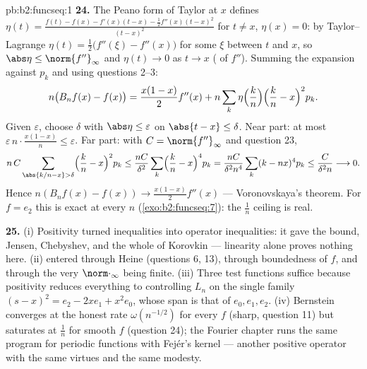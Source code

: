 \begin{solution}{pb:b2:funcseq:1}
\textbf{24.} The Peano form of Taylor at $x$ defines $\eta(t) =
\frac{f(t) - f(x) - f'(x)(t-x) - \frac12f''(x)(t-x)^2}
{(t-x)^2}$ for $t \neq x$, $\eta(x) = 0$: by Taylor--Lagrange
$\eta(t) = \frac12\bigl(f''(\xi) - f''(x)\bigr)$ for some $\xi$
between $t$ and $x$, so $\abs\eta \leq \norm{f''}_\infty$ and
$\eta(t) \to 0$ as $t \to x$ ( of $f''$). Summing
the expansion against $p_k$ and using questions 2--3:
\[
n\bigl(B_nf(x) - f(x)\bigr)
= \frac{x(1-x)}{2}f''(x)
+ n\sum_k\eta\Bigl(\frac kn\Bigr)\Bigl(\frac kn -
x\Bigr)^2p_k .
\]
Given $\varepsilon$, choose $\delta$ with $\abs\eta \leq
\varepsilon$ on $\abs{t - x}\leq\delta$. Near part: at most
$\varepsilon\,n\cdot\frac{x(1-x)}n \leq \varepsilon$. Far part:
with $C = \norm{f''}_\infty$ and question 23,
\[
n\,C\sum_{\abs{k/n-x}>\delta}\Bigl(\frac kn -
x\Bigr)^2p_k
\leq \frac{nC}{\delta^2}\sum_k\Bigl(\frac kn -
x\Bigr)^4p_k
= \frac{nC}{\delta^2 n^4}\sum_k(k-nx)^4p_k
\leq \frac{C}{\delta^2 n} \longrightarrow 0 .
\]
Hence $n(B_nf(x) - f(x)) \to \frac{x(1-x)}2f''(x)$ ---
Voronovskaya's theorem. For $f = e_2$ this is exact at every
$n$ (\cref{exo:b2:funcseq:7}): the $\frac1n$ ceiling is real.

\textbf{25.} (i) Positivity turned  inequalities into
operator inequalities: it gave the  bound, Jensen,
Chebyshev, and the whole of Korovkin --- linearity alone proves
nothing here. (ii)  entered through Heine (questions
6, 13), through boundedness of $f$, and through the very 
$\norm\cdot_\infty$ being finite. (iii) Three test functions
suffice because positivity reduces everything to controlling
$L_n$ on the single family $(s-x)^2 = e_2 - 2xe_1 + x^2e_0$,
whose span is that of $e_0, e_1, e_2$. (iv) Bernstein converges
at the honest rate $\omega(n^{-1/2})$ for every  $f$
(sharp, question 11) but saturates at $\frac1n$ for smooth $f$
(question 24); the Fourier chapter runs the same program for
periodic functions with Fej\'er's kernel --- another positive
operator with the same virtues and the same modesty.
\end{solution}
